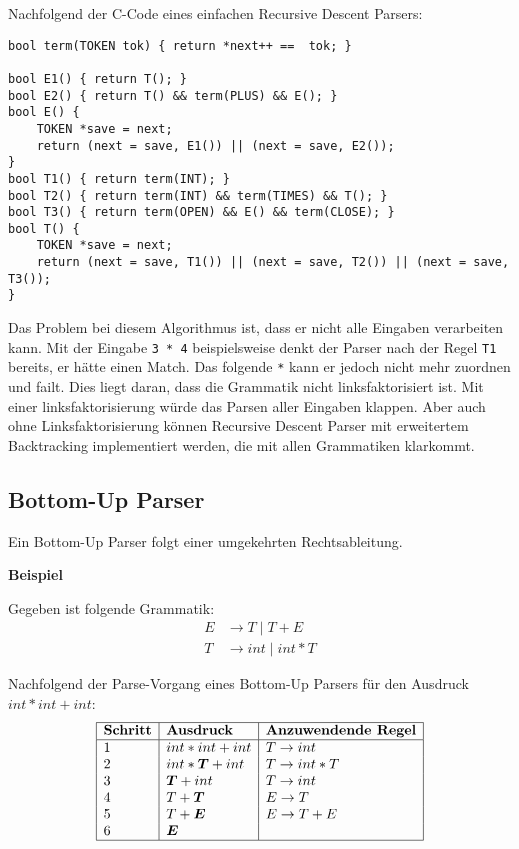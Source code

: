 Nachfolgend der C-Code eines einfachen Recursive Descent Parsers:

\begin{verbatim}
bool term(TOKEN tok) { return *next++ ==  tok; }

bool E1() { return T(); }
bool E2() { return T() && term(PLUS) && E(); }
bool E() {
    TOKEN *save = next;
    return (next = save, E1()) || (next = save, E2());
}
bool T1() { return term(INT); }
bool T2() { return term(INT) && term(TIMES) && T(); }
bool T3() { return term(OPEN) && E() && term(CLOSE); }
bool T() {
    TOKEN *save = next;
    return (next = save, T1()) || (next = save, T2()) || (next = save, T3());
}
\end{verbatim}

Das Problem bei diesem Algorithmus ist, dass er nicht alle Eingaben verarbeiten
kann. Mit der Eingabe \texttt{3 * 4} beispielsweise denkt der Parser nach der
Regel \texttt{T1} bereits, er hätte einen Match. Das folgende \texttt{*} kann er
jedoch nicht mehr zuordnen und failt. Dies liegt daran, dass die Grammatik nicht
linksfaktorisiert ist. Mit einer linksfaktorisierung würde das Parsen aller
Eingaben klappen. Aber auch ohne Linksfaktorisierung können Recursive Descent
Parser mit erweitertem Backtracking implementiert werden, die mit allen
Grammatiken klarkommt.


\subsection{Bottom-Up Parser} 

Ein Bottom-Up Parser folgt einer umgekehrten Rechtsableitung.

\textbf{Beispiel}

Gegeben ist folgende Grammatik:
%
\begin{align*}
	E &\rightarrow T \mid T + E \\
	T &\rightarrow int \mid int * T
\end{align*}

Nachfolgend der Parse-Vorgang eines Bottom-Up Parsers für den Ausdruck $int * int + int$:
\[
	\begin{array}{|l|l|l|}
		\hline
		\textbf{Schritt} & \textbf{Ausdruck} & \textbf{Anzuwendende Regel} \\
		\hline
		1 & int * int + int & T \rightarrow int \\
		2 & int * \boldsymbol T + int & T \rightarrow int * T \\
		3 & \boldsymbol T + int & T \rightarrow int \\
		4 & T + \boldsymbol T & E \rightarrow T \\
		5 & T + \boldsymbol E & E \rightarrow T + E \\
		6 & \boldsymbol E & \\
		\hline
	\end{array}
\]

